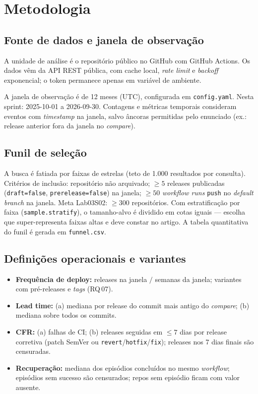 
\section{Metodologia}

\subsection{Fonte de dados e janela de observação}

A unidade de análise é o repositório público no GitHub com GitHub Actions.
Os dados vêm da API REST pública, com cache local, \textit{rate limit} e
\textit{backoff} exponencial; o token permanece apenas em variável de ambiente.

A janela de observação é de 12 meses (UTC), configurada em \texttt{config.yaml}.
Nesta sprint: 2025-10-01 a 2026-09-30. Contagens e métricas temporais consideram
eventos com \textit{timestamp} na janela, salvo âncoras permitidas pelo enunciado
(ex.: release anterior fora da janela no \textit{compare}).

\subsection{Funil de seleção}

A busca é fatiada por faixas de estrelas (teto de 1.000 resultados por consulta).
Critérios de inclusão: repositório não arquivado; $\geq 5$ releases publicadas
(\texttt{draft=false}, \texttt{prerelease=false}) na janela; $\geq 50$
\textit{workflow runs} \texttt{push} no \textit{default branch} na janela.
Meta Lab03S02: $\geq 300$ repositórios. Com estratificação por faixa
(\texttt{sample.stratify}), o tamanho-alvo é dividido em cotas iguais ---
escolha que super-representa faixas altas e deve constar no artigo.
A tabela quantitativa do funil é gerada em \texttt{funnel.csv}.

\subsection{Definições operacionais e variantes}

\begin{itemize}
  \item \textbf{Frequência de deploy:} releases na janela $/$ semanas da janela;
    variantes com pré-releases e \textit{tags} (RQ\,07).
  \item \textbf{Lead time:} (a) mediana por release do commit mais antigo do
    \textit{compare}; (b) mediana sobre todos os commits.
  \item \textbf{CFR:} (a) falhas de CI; (b) releases seguidas em $\leq 7$ dias
    por release corretiva (patch SemVer ou \texttt{revert}/\texttt{hotfix}/\texttt{fix});
    releases nos 7 dias finais são censuradas.
  \item \textbf{Recuperação:} mediana dos episódios concluídos no mesmo
    \textit{workflow}; episódios sem sucesso são censurados; repos sem episódio
    ficam com valor ausente.
\end{itemize}

